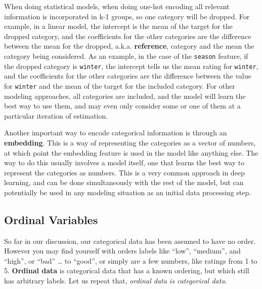 \documentclass[
  letterpaper,
]{krantz}
\begin{document}
\begin{tcolorbox}[enhanced jigsaw, toprule=.15mm, colback=white, breakable, rightrule=.15mm, arc=.35mm, bottomrule=.15mm, opacityback=0, colframe=quarto-callout-note-color-frame, leftrule=.75mm, left=2mm]
\begin{minipage}[t]{5.5mm}
\textcolor{quarto-callout-note-color}{\faInfo}
\end{minipage}%
\begin{minipage}[t]{\textwidth - 5.5mm}

When doing statistical models, when doing one-hot encoding all relevant
information is incorporated in k-1 groups, so one category will be
dropped. For example, in a linear model, the intercept is the mean of
the target for the dropped category, and the coefficients for the other
categories are the difference between the mean for the dropped, a.k.a.
\textbf{reference}, category and the mean the category being considered.
As an example, in the case of the \texttt{season} feature, if the
dropped category is \texttt{winter}, the intercept tells us the mean
rating for \texttt{winter}, and the coefficients for the other
categories are the difference between the value for \texttt{winter} and
the mean of the target for the included category. For other modeling
approaches, all categories are included, and the model will learn the
best way to use them, and may even only consider some or one of them at
a particular iteration of estimation.

\end{minipage}%
\end{tcolorbox}

Another important way to encode categorical information is through an
\textbf{embedding}. This is a way of representing the categories as a
vector of numbers, at which point the embedding feature is used in the
model like anything else. The way to do this usually involves a model
itself, one that learns the best way to represent the categories as
numbers. This is a very common approach in deep learning, and can be
done simultaneously with the rest of the model, but can potentially be
used in any modeling situation as an initial data processing step.

\subsection{Ordinal Variables}\label{sec-data-ordinal}

So far in our discussion, our categorical data has been assumed to have
no order. However you may find yourself with orders labels like ``low'',
``medium'', and ``high'', or ``bad'' \ldots{} to ``good'', or simply are
a few numbers, like ratings from 1 to 5. \textbf{Ordinal data} is
categorical data that has a known ordering, but which still has
arbitrary labels. Let us repeat that, \emph{ordinal data is categorical
data}.
\end{document}
